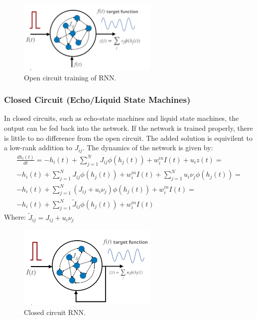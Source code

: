 \documentclass[11pt]{book} %
\begin{document}
\begin{figure}[ht]
\centering
\includegraphics[width=0.6\textwidth]{Figs/RNN_open_circuit.jpeg}
\caption{Open circuit training of RNN.}
\label{fig:rnn_learning}
\end{figure}


\subsubsection{Closed Circuit (Echo/Liquid State Machines)}
In closed circuits, such as echo-state machines and liquid state machines, the output can be fed back into the network. 
If the network is trained properly, there is little to no difference from the open circuit.
The added solution is equivilent to a low-rank addition to $J_{ij}$.
The dynamics of the network is given by:
\begin{align*}
    \frac{dh_i(t)}{dt} = -h_i(t) + \sum_{j=1}^N J_{ij} \phi(h_j(t)) + w_i^{in} I(t) + u_i z(t) = \\
    -h_i(t) + \sum_{j=1}^N J_{ij} \phi(h_j(t)) + w_i^{in} I(t) + \sum_{j=1}^N u_i \nu_j \phi(h_j(t)) = \\
    -h_i(t) + \sum_{j=1}^N (J_{ij} + u_i \nu_j) \phi(h_j(t)) + w_i^{in} I(t) = \\
    -h_i(t) + \sum_{j=1}^N \tilde{J}_{ij} \phi(h_j(t)) + w_i^{in} I(t)
\end{align*}
Where: $\tilde{J}_{ij} = J_{ij} + u_i \nu_j$

\begin{figure}[ht]
\centering
\includegraphics[width=0.6\textwidth]{Figs/RNN_closed_circuit.jpeg}
\caption{Closed circuit RNN.}
\label{fig:rnn_learning}
\end{figure}
\end{document}
